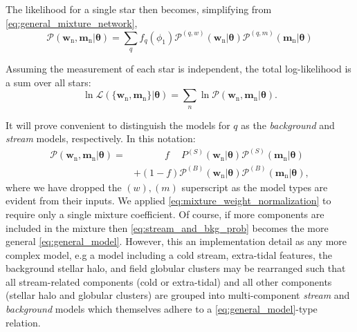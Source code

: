 \documentclass[twocolumn]{aastex631}
\newcommand{\mrm}[1]{\mathrm{#1}}
\newcommand{\mbs}[1]{\boldsymbol{#1}}
\newcommand{\mcal}[1]{\mathcal{#1}}
\newcommand{\pdf}{\mcal{P}}
\newcommand{\nth}[1]{{#1}_{\mrm{n}}}  %
\newcommand{\smallcomponent}[2]{#2^{\scriptscriptstyle (#1)}}
\newcommand{\cmp}[2]{\smallcomponent{#1}{#2}}
\newcommand{\Scmp}[1]{\cmp{S}{#1}}
\newcommand{\Bcmp}[1]{\cmp{B}{#1}}
\newcommand{\Spdf}{\Scmp{\pdf}}
\newcommand{\Bpdf}{\Bcmp{\pdf}}
\begin{document}
        The likelihood for a single star then becomes, simplifying from
        \autoref{eq:general_mixture_network},
        \begin{equation} \label{eq:general_model}
            \!\!\!\!\! \pdf(\nth{\mbs{w}}, \! \nth{\mbs{m}} | \mbs{\theta})
                \!=\! \sum_{q} \! f_q(\phi_1) \cmp{q,w}{\pdf}(\nth{\mbs{w}}|\mbs{\theta}) \cmp{q,m}{\pdf}(\nth{\mbs{m}}|\mbs{\theta})
        \end{equation}

        Assuming the measurement of each star is independent, the total
        log-likelihood is a sum over all stars:
        \begin{equation} \label{eq:general_likelihood}
            \ln\mcal{L}\left(\{\nth{\mbs{w}},\nth{\mbs{m}}\} | \mbs{\theta}\right) = \sum_n \ln \pdf(\nth{\mbs{w}}, \nth{\mbs{m}} | \mbs{\theta}).
        \end{equation}

        It will prove convenient to distinguish the models for $q$ as the
        \textit{background} and \textit{stream} models, respectively. In this
        notation:
        \begin{align} \label{eq:stream_and_bkg_prob}
            \pdf(\nth{\mbs{w}}, \nth{\mbs{m}} | \mbs{\theta})
            =& \phantom{+} \qquad f \phantom{+} \Scmp{P}(\nth{\mbs{w}}|\mbs{\theta}) \Spdf(\nth{\mbs{m}}|\mbs{\theta}) \\
            & + (1-f) \Bpdf(\nth{\mbs{w}}|\mbs{\theta}) \Bpdf(\nth{\mbs{m}}|\mbs{\theta}), \nonumber
        \end{align}
        where we have dropped the $(w), (m)$ superscript as the model types are
        evident from their inputs. We applied
        \autoref{eq:mixture_weight_normalization} to require only a single
        mixture coefficient.  Of course, if more components are included in the
        mixture then \autoref{eq:stream_and_bkg_prob} becomes the more general
        \autoref{eq:general_model}. However, this an implementation detail as
        any more complex model, e.g a model including a cold stream, extra-tidal
        features, the background stellar halo, and field globular clusters may
        be rearranged such that all stream-related components (cold or
        extra-tidal) and all other components (stellar halo and globular
        clusters) are grouped into multi-component \textit{stream} and
        \textit{background} models which themselves adhere to a
        \autoref{eq:general_model}-type relation.
\end{document}
